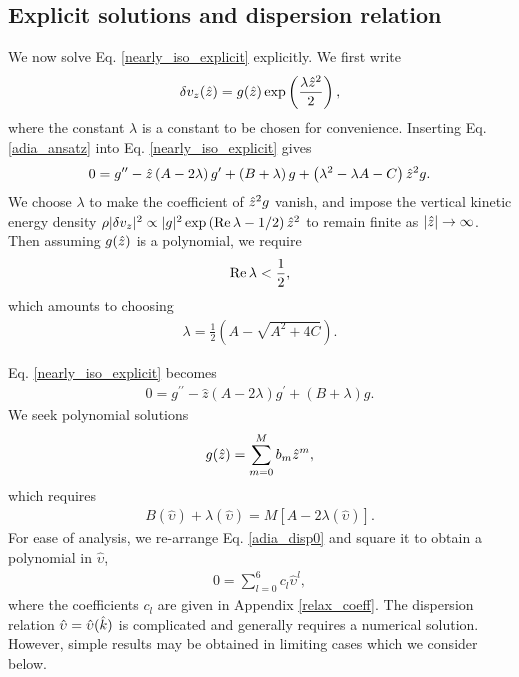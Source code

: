 \subsection{Explicit solutions and dispersion relation}\label{disp_relax}
We now solve Eq. \ref{nearly_iso_explicit} explicitly. We first write  
\begin{align}
  \delta v_z(\hat{z}) =
  g(\hat{z})\exp\left(\frac{\lambda\hat{z}^2}{2}\right), \label{adia_ansatz}
\end{align}
where the constant $\lambda$ is a constant to be chosen for convenience. Inserting
Eq. \ref{adia_ansatz} into Eq. \ref{nearly_iso_explicit} gives
\begin{align}
  0 = g^{\prime\prime} - \hat{z}\left(A - 2\lambda\right)g^\prime + \left(B +
    \lambda\right)g
  +\left(\lambda^2 - \lambda A - C\right)\hat{z}^2 g.
\end{align}
We choose $\lambda$ to make the coefficient of $\hat{z}^2g$
vanish, and impose the vertical kinetic energy density
$\rho|\delta v_z|^2\propto |g|^2 \exp{\left(\operatorname{Re}\lambda -
    1/2\right)\hat{z}^2}$ to remain finite as $|\hat{z}|\to\infty$. 
Then assuming $g(\hat{z})$ is a polynomial, we require  
\begin{align}
  \operatorname{Re}\lambda < \frac{1}{2}, 
\end{align}
which amounts to choosing 
\begin{align}
  \lambda = \frac{1}{2}\left(A - \sqrt{A^2 + 4C}\right).  
\end{align} 


Eq. \ref{nearly_iso_explicit} becomes 
\begin{align}
  0 = g^{\prime\prime} - \hat{z}\left(A - 2\lambda\right)g^\prime +
  \left(B + \lambda\right)g.
\end{align}
We seek polynomial solutions 
\begin{align}
  g(\hat{z}) = \sum_{m=0}^M b_m \hat{z}^m,
\end{align}
which requires
\begin{align}
  B(\hat{\upsilon}) + \lambda(\hat{\upsilon}) =
  M\left[A-2\lambda(\hat{\upsilon})\right].\label{adia_disp0} 
\end{align}
For ease of analysis, we re-arrange Eq. \ref{adia_disp0} and square it
to obtain a polynomial in $\hat{\upsilon}$,  
\begin{align}
  0 = \sum_{l=0}^{6}c_l\hat{\upsilon}^l,\label{relax_disp}
\end{align}
where the coefficients $c_l$ are given in Appendix \ref{relax_coeff}.
The dispersion relation $\hat{\upsilon}=\hat{\upsilon}(\hat{k})$ is
complicated and generally requires a numerical solution. However,
simple results may be obtained in limiting cases which we consider
below.  

